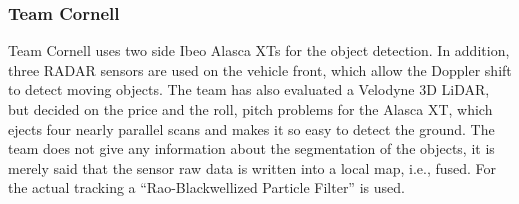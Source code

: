 \documentclass[11pt,oneside,openright]{mpreport}
\begin{document}
\subsubsection{Team Cornell}
Team Cornell \cite{Campbell2007} uses two side Ibeo Alasca XTs for the object detection. In addition, three RADAR sensors are used on the vehicle front, 
which allow the Doppler shift to detect moving objects. The team has also evaluated a Velodyne 3D LiDAR, but decided on the price and the roll, pitch problems
for the Alasca XT, which ejects four nearly parallel scans and makes it so easy to detect the ground. The team does not give any information about the
segmentation of the objects, it is merely said that the sensor raw data is written into a local map, i.e., fused. For the actual tracking a 
``Rao-Blackwellized Particle Filter'' \cite{miller2007rao} is used.
\end{document}
